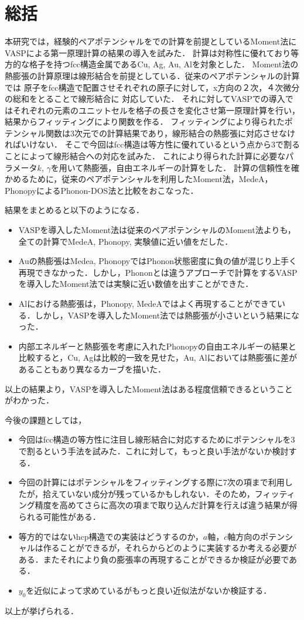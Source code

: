 \chapter{総括}
本研究では，経験的ペアポテンシャルをでの計算を前提としているMoment法にVASPによる第一原理計算の結果の導入を試みた．
計算は対称性に優れており等方的な格子を持つfcc構造金属であるCu, Ag, Au, Alを対象とした．
Moment法の熱膨張の計算原理は線形結合を前提としている．従来のペアポテンシャルの計算では
原子をfcc構造で配置させそれぞれの原子に対して，x方向の２次，４次微分の総和をとることで線形結合に
対応していた．
それに対してVASPでの導入ではそれぞれの元素のユニットセルを格子の長さを変化させ第一原理計算を行い，結果からフィッティングにより関数を作る．
フィッティングにより得られたポテンシャル関数は3次元での計算結果であり，線形結合の熱膨張に対応させなければいけない．
そこで今回はfcc構造は等方性に優れているという点から3で割ることによって線形結合への対応を試みた．
これにより得られた計算に必要なパラメータ$k$, $\gamma$を用いて熱膨張，自由エネルギーの計算をした．
計算の信頼性を確かめるために，従来のペアポテンシャルを利用したMoment法，MedeA，PhonopyによるPhonon-DOS法と比較をおこなった．

結果をまとめると以下のようになる．
\begin{itemize}
 \item VASPを導入したMoment法は従来のペアポテンシャルのMoment法よりも，全ての計算でMedeA, Phonopy, 実験値に近い値をだした．
 \item Auの熱膨張はMedea, PhonopyではPhonon状態密度に負の値が混じり上手く再現できなかった．しかし，Phononとは違うアプローチで計算をするVASPを導入したMoment法では実験に近い数値を出すことができた．
  \item Alにおける熱膨張は，Phonopy, MedeAではよく再現することができている．しかし，VASPを導入したMoment法では熱膨張が小さいという結果になった．
 \item 内部エネルギーと熱膨張を考慮に入れたPhonopyの自由エネルギーの結果と比較すると，Cu, Agは比較的一致を見せた，Au, Alにおいては熱膨張に差があることもあり異なるカーブを描いた．
\end{itemize}
以上の結果より，VASPを導入したMoment法はある程度信頼できるということがわかった．

今後の課題としては，

\begin{itemize}
 \item 今回はfcc構造の等方性に注目し線形結合に対応するためにポテンシャルを3で割るという手法を試みた．これに対して，もっと良い手法がないか検討する．
 \item 今回の計算にはポテンシャルをフィッティングする際に7次の項まで利用したが，拾えていない成分が残っているかもしれない．そのため，フィッティング精度を高めてさらに高次の項まで取り込んだ計算を行えば違う結果が得られる可能性がある．
  \item 等方的ではないhcp構造での実装はどうするのか，$a$軸，$c$軸方向のポテンシャルは作ることができるが，それらからどのように実装するか考える必要がある．またそれにより負の膨張率の再現することができるか検証が必要である．
  \item $y_0$を近似によって求めているがもっと良い近似法がないか検証する．
\end{itemize}
以上が挙げられる．



